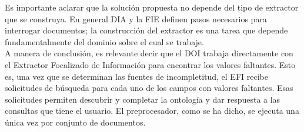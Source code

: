Es importante aclarar que la solución propuesta no depende del tipo de extractor que se construya. En general DIA y la FIE definen pasos necesarios para interrogar documentos; la construcción del extractor es una tarea que depende fundamentalmente del dominio sobre el cual se trabaje. \\

A manera de conclusión, es relevante decir que el DOI trabaja directamente con el Extractor Focalizado de Información para encontrar los valores faltantes. Esto es, una vez que se determinan las fuentes de incompletitud, el EFI recibe solicitudes de búsqueda para cada uno de los campos con valores faltantes. Esas solicitudes permiten descubrir y completar la ontología y dar respuesta a las consultas que tiene el usuario. El preprocesador, como se ha dicho, se ejecuta una única vez por conjunto de documentos. \\

